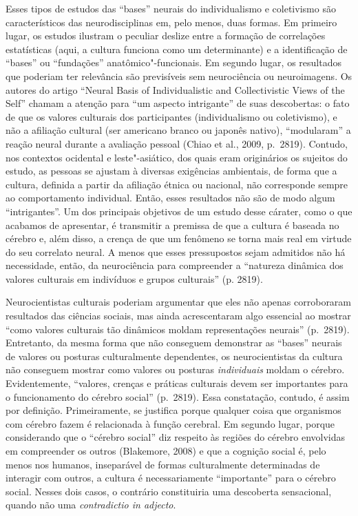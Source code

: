 Esses tipos de estudos das ``bases'' neurais do individualismo e
coletivismo são característicos das neurodisciplinas em, pelo menos,
duas formas. Em primeiro lugar, os estudos ilustram o peculiar deslize
entre a formação de correlações estatísticas (aqui, a cultura funciona
como um determinante) e a identificação de ``bases'' ou ``fundações''
anatômico"-funcionais. Em segundo lugar, os resultados que poderiam ter
relevância são previsíveis sem neurociência ou neuroimagens. Os autores
do artigo ``Neural Basis of Individualistic and Collectivistic Views of
the Self'' chamam a atenção para ``um aspecto intrigante'' de suas
descobertas: o fato de que os valores culturais dos participantes
(individualismo ou coletivismo), e não a afiliação cultural (ser
americano branco ou japonês nativo), ``modularam'' a reação neural
durante a avaliação pessoal (Chiao et al., 2009, p.~2819). Contudo, nos
contextos ocidental e leste"-asiático, dos quais eram originários os
sujeitos do estudo, as pessoas se ajustam à diversas exigências
ambientais, de forma que a cultura, definida a partir da afiliação
étnica ou nacional, não corresponde sempre ao comportamento individual.
Então, esses resultados não são de modo algum ``intrigantes''. Um dos
principais objetivos de um estudo desse cárater, como o que acabamos de
apresentar, é transmitir a premissa de que a cultura é baseada no
cérebro e, além disso, a crença de que um fenômeno se torna mais real em
virtude do seu correlato neural. A menos que esses pressupostos sejam
admitidos não há necessidade, então, da neurociência para compreender a
``natureza dinâmica dos valores culturais em indivíduos e grupos
culturais'' (p. 2819).

Neurocientistas culturais poderiam argumentar que eles não apenas
corroboraram resultados das ciências sociais, mas ainda acrescentaram
algo essencial ao mostrar ``como valores culturais tão dinâmicos moldam
representações neurais'' (p.~2819). Entretanto, da mesma forma que não
conseguem demonstrar as ``bases'' neurais de valores ou posturas
culturalmente dependentes, os neurocientistas da cultura não conseguem
mostrar como valores ou posturas \emph{individuais} moldam o cérebro.
Evidentemente, ``valores, crenças e práticas culturais devem ser
importantes para o funcionamento do cérebro social'' (p.~2819). Essa
constatação, contudo, é assim por definição. Primeiramente, se justifica
porque qualquer coisa que organismos com cérebro fazem é relacionada à
função cerebral. Em segundo lugar, porque considerando que o ``cérebro
social'' diz respeito às regiões do cérebro envolvidas em compreender os
outros (Blakemore, 2008) e que a cognição social é, pelo menos nos
humanos, inseparável de formas culturalmente determinadas de interagir
com outros, a cultura é necessariamente ``importante'' para o cérebro
social. Nesses dois casos, o contrário constituiria uma descoberta
sensacional, quando não uma \emph{contradictio in adjecto}.

